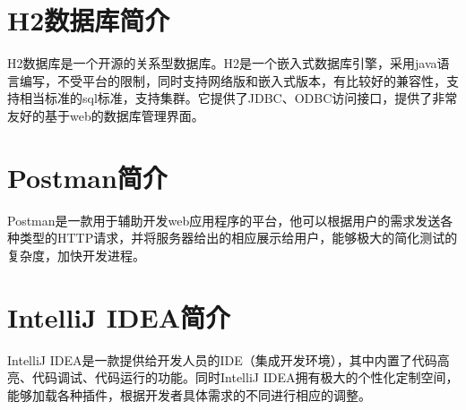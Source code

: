 \section{H2数据库简介}

H2数据库是一个开源的关系型数据库。H2是一个嵌入式数据库引擎，采用java语言编写，不受平台的限制，同时支持网络版和嵌入式版本，有比较好的兼容性，支持相当标准的sql标准，支持集群。它提供了JDBC、ODBC访问接口，提供了非常友好的基于web的数据库管理界面。

\section{Postman简介}

Postman是一款用于辅助开发web应用程序的平台，他可以根据用户的需求发送各种类型的HTTP请求，并将服务器给出的相应展示给用户，能够极大的简化测试的复杂度，加快开发进程。

\section{IntelliJ IDEA简介}

IntelliJ IDEA是一款提供给开发人员的IDE（集成开发环境），其中内置了代码高亮、代码调试、代码运行的功能。同时IntelliJ IDEA拥有极大的个性化定制空间，能够加载各种插件，根据开发者具体需求的不同进行相应的调整。


















